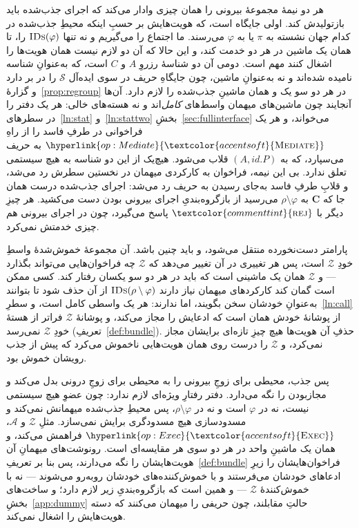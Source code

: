 \documentclass[10pt,oneside,openany]{book}
\newcommand{\Cs}{\mathbf{C}}
\newcommand{\Zenv}{\mathcal{Z}}
\newcommand{\Adv}{\mathcal{A}}
\newcommand{\Sim}{\mathcal{S}}
\newcommand{\op}[1]{\textnormal{\textsc{#1}}}
\newcommand{\opl}[1]{\hyperlink{op:#1}{\textcolor{accentsoft}{\op{#1}}}}
\newcommand{\IDs}{\op{IDs}}
\newcommand{\id}{id}
\newcommand{\atom}[1]{\textcolor{commenttint}{\op{#1}}}
\newcommand{\rej}{\atom{rej}}
\theoremstyle{accentdef}
\theoremstyle{accentplain}
\begin{document}
هر دو نیمهٔ مجموعهٔ بیرونی را همان چیزی وادار می‌کند که اجرای جذب‌شده باید
بازتولیدش کند. اولی جایگاه است، که هویت‌هایش بر حسبِ اینکه محیطِ جذب‌شده
در کدام جهان نشسته به $\pi$ یا به $\varphi$ می‌رسند. ما اجتماع را
می‌گیریم و نه تنها $\IDs(\varphi)$ را، تا همان یک ماشین در هر دو خدمت
کند، و این حالا که آن دو لازم نیست همان هویت‌ها را اشغال کنند مهم است.
دومی آن دو شناسهٔ رزروِ $A$ و $C$ است، که به‌عنوانِ شناسه نامیده شده‌اند و
نه به‌عنوانِ ماشین، چون جایگاهِ حریف در سوی ایده‌آل $\Sim$ را در بر دارد و
گزارهٔ~\ref{prop:regroup} در هر دو سو یک و همان ماشینِ جذب‌شده را لازم
دارد. آن‌ها آنجایند چون ماشین‌های میهمان واسط‌های \emph{کامل}‌اند و نه
هسته‌های خالی: هر یک دفتر را در سطرهای~\ref{ln:stat}
و~\ref{ln:stattwo}ِ بخشِ~\ref{sec:fullinterface} می‌خواند، و هر یک
فراخوانی در طرفِ فاسد را از راهِ $\opl{Mediate}$ به حریف می‌سپارد، که به
$(A,\id.P)$ قلاب می‌شود. هیچ‌یک از این دو شناسه به هیچ سیستمی تعلق ندارد.
بی این نیمه، فراخوان به کارکردی میهمان در نخستین سطرش رد می‌شد، و قلابِ
طرفِ فاسد به‌جای رسیدن به حریف رد می‌شد: اجرای جذب‌شده درست همان جا که
$\Cs$ به $\rho \setminus \varphi$ می‌رسید از بازگروه‌بندیِ اجرای بیرونی
بودن دست می‌کشید. هر چیزِ دیگر با $\rej$ پاسخ می‌گیرد، چون در اجرای
بیرونی هم چیزی خدمتش نمی‌کرد.

پارامتر دست‌نخورده منتقل می‌شود، و باید چنین باشد. آن مجموعهٔ خموش‌شدهٔ
واسطِ خودِ $\Zenv$ است، پس هر تغییری در آن تغییر می‌دهد که $\Zenv$ چه
فراخوان‌هایی می‌تواند بگذارد --- و $\Zenv$ همان یک ماشینی است که باید در
هر دو سو یکسان رفتار کند. کسی ممکن است گمان کند کارکردهای میهمان نیاز
دارند $\IDs(\rho \setminus \varphi)$ از آن حذف شود تا بتوانند به‌عنوانِ
خودشان سخن بگویند، اما ندارند: هر یک واسطی کامل است، و
سطرِ~\ref{ln:call} از پوشانهٔ خودش همان است که ادعایش را مجاز می‌کند، و
پوشانهٔ $\Zenv$ فراتر از هستهٔ خودِ $\Zenv$ نمی‌رسد
(تعریفِ~\ref{def:bundle}). حذفِ آن هویت‌ها هیچ چیزِ تازه‌ای برایشان مجاز
نمی‌کرد، و $\Zenv$ را درست روی همان هویت‌هایی ناخموش می‌کرد که پیش از جذب
رویشان خموش بود.

پس جذب، محیطی برای زوجِ بیرونی را به محیطی برای زوجِ درونی بدل می‌کند و
مجازبودن را نگه می‌دارد. دفتر رفتارِ ویژه‌ای لازم ندارد: چون عضوِ هیچ
سیستمی نیست، نه در $\varphi$ است و نه در $\rho \setminus \varphi$، پس
محیطِ جذب‌شده میهمانش نمی‌کند و مسدودسازی هیچ مسدودگری برایش نمی‌سازد.
مثلِ $\Zenv$ و $\Adv$، $\opl{Exec}$ فراهمش می‌کند، و همان یک ماشینِ واحد
در هر دو سوی هر مقایسه‌ای است. رونوشت‌های میهمانِ آن هویت‌هایشان را نگه
می‌دارند، پس بنا بر تعریفِ~\ref{def:bundle} فراخوان‌هایشان را زیرِ
ادعاهای خودشان می‌فرستند و با خموش‌کننده‌های خودشان روبه‌رو می‌شوند ---
نه با خموش‌کنندهٔ $\Zenv$ --- و همین است که بازگروه‌بندیِ زیر لازم دارد؛
و ساخت‌های بخشِ~\ref{app:dummy} حالتِ مقابلند، چون حریفی را میهمان
می‌کنند که دسته هویت‌هایش را اشغال نمی‌کند.
\end{document}
